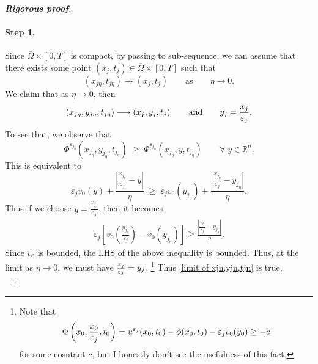 \documentclass[12pt, oneside]{amsart}  	%
\begin{document}
\begin{proof}[\textbf{Rigorous proof}]
\paragraph{\textbf{Step 1.}} Since $\overline{\Omega}\times [0,T]$ is compact, by passing to sub-sequence, we can assume that there exists some point $\left(x_j,t_j\right)\in \overline{\Omega}\times[0,T]$ such that
\begin{equation*}
\left(x_{j\eta},t_{j\eta}\right)\longrightarrow \left(x_j,t_j\right)\qquad\text{as}\qquad \eta\longrightarrow 0.
\end{equation*}
We claim that as $\eta\longrightarrow 0$, then 
\begin{equation} \label{limit of xjn,yjn,tjn}
\left(x_{j\eta}, y_{j\eta}, t_{j\eta}\right)\longrightarrow \left(x_j, y_j, t_j\right) \qquad\text{and}\qquad y_j=\frac{x_j}{\varepsilon_j}.
\end{equation} 
To see that, we observe that
\begin{equation*}
\Phi^{\varepsilon_{j_\eta}}\left(x_{j_\eta}, y_{j_\eta}, t_{j_\eta}\right) \;\geq\; \Phi^{\varepsilon_{j_\eta}}\left(x_{j_\eta}, y, t_{j_\eta}\right) \qquad\forall \;y \in \mathbb{R}^n.
\end{equation*}
This is equivalent to
\begin{equation*}
\varepsilon_j v_0\left(y\right) + \frac{\left|\frac{x_{j_\eta}}{\varepsilon_j} - y\right|}{\eta} \;\geq\; \varepsilon_j v_0\left(y_{j_\eta}\right) + \frac{\left|\frac{x_{j_\eta}}{\varepsilon_j} - y_{j_\eta} \right|}{\eta}.
\end{equation*}
Thus if we choose $y = \frac{x_{j_\eta}}{\varepsilon_j}$, then it becomes 
\begin{align*}
\varepsilon_j\left[v_0\left(\frac{y_{j_\eta}}{\varepsilon_j}\right) - v_0\left(y_{j_\eta}\right)\right] \geq \frac{\left|\frac{x_{j_\eta}}{\varepsilon_j} - y_{j_\eta} \right|}{\eta}.
\end{align*}
Since $v_0$ is bounded, the LHS of the above inequality is bounded. Thus, at the limit as $\eta \longrightarrow 0$, we must have $\frac{x_j}{\varepsilon_j}=y_j$. \footnote{Note that $$\Phi\left(x_0,\frac{x_0}{\varepsilon_j},t_0\right) =  u^{\varepsilon_j}(x_0, t_0) - \phi(x_0, t_0) - \varepsilon_j v_0(y_0) \geq -c$$ for some cosntant $c$, but I honestly don't see the usefulness of this fact.} Thus \eqref{limit of xjn,yjn,tjn} is true.\\
	

\end{proof}
\end{document}
